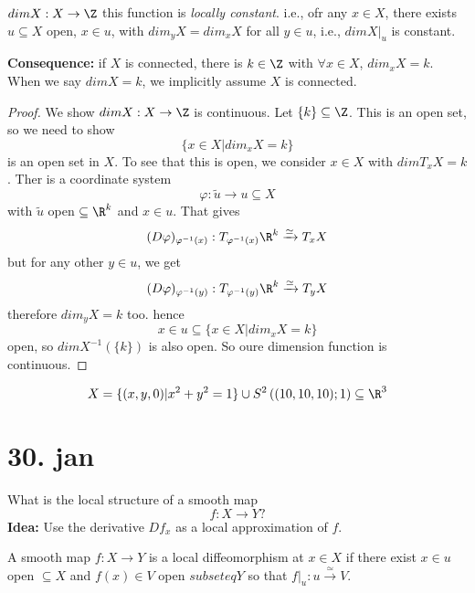 \begin{proposition}
  $dimX:X\to \Z$
  \newline this function is \emph{locally constant}.
  \newline i.e., ofr any $x\in X$, there exists $u\subseteq X$ open, $x\in u$, with $dim_yX=dim_xX$ for all $y\in u$, i.e., $dimX\rvert_{u}$ is constant.
\end{proposition}
\textbf{Consequence:} if $X$ is connected, there is $k\in \Z$ with $\forall x\in X$, $dim_xX=k$.
\newline When we say $dim X=k$, we implicitly assume $X$ is connected.
\begin{proof}
  We show $dim X:X\to \Z$ is continuous. Let $\{k\} \subseteq \Z$. This is an open set, so we need to show
    $$\{x\in X | dim_xX=k\}$$
  is an open set in $X$.
  \newline To see that this is open, we consider $x\in X$ with $dimT_xX=k$. Ther is a coordinate system
    $$\varphi : \tilde{u}\to u \subseteq X$$
    with $\tilde{u}$ open $\subseteq \R^k$ and $x\in u$.
    \newline That gives
      $$(D \varphi )_{\varphi ^{-1}(x)}: T_{\varphi ^{-1} (x)}\R^k \xrightarrow{\simeq}T_xX$$
      but for any other $y\in u$, we get
        $$(D \varphi )_{\varphi ^{-1}(y)}: T_{\varphi ^{-1} (y)}\R^k \xrightarrow{\simeq}T_yX$$
        therefore $dim_yX=k$ too.
      \newline hence
        $$x\in u \subseteq\{x\in X|dim_xX=k\}$$
      open, so $dimX ^{-1}(\{k\})$ is also open. So oure dimension function is continuous.
\end{proof}
\begin{example}
  $$X=\{(x,y,0) | x^2+y^2=1 \} \cup S^2 \left((10,10,10);1\right)\subseteq \R^3$$
\end{example}

\section{30. jan}
What is the local structure of a smooth map
  $$f:X\to Y?$$
\textbf{Idea:} Use the derivative $Df_x$ as a local approximation of $f$.

\begin{definition}
  A smooth map $f: X \to Y  $ is a local diffeomorphism at $x\in X$ if there exist $x\in u$ open $\subseteq X$ and $f(x)\in V $ open $subseteq Y$ so that $f\rvert_{u}:u\xrightarrow{\simeq} V$.
\end{definition}

